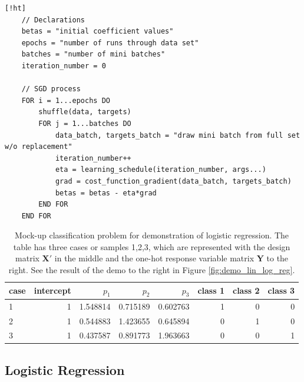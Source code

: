 \documentclass[]{article}
\begin{document}
\begin{lstlisting}[caption={Stochastic Gradient Descent algorithm. Cost function gradients and learning schedules may be defined independently of the implementation of SGD. This implementation runs for \lstinline|epochs*batches| iterations, and does not sense if or when it converges.},label={lst:sgd}] [!ht]
	// Declarations
	betas = "initial coefficient values"
	epochs = "number of runs through data set"
	batches = "number of mini batches"
	iteration_number = 0

	// SGD process	
	FOR i = 1...epochs DO
		shuffle(data, targets)
		FOR j = 1...batches DO
			data_batch, targets_batch = "draw mini batch from full set w/o replacement"
			iteration_number++
			eta = learning_schedule(iteration_number, args...)
			grad = cost_function_gradient(data_batch, targets_batch)
			betas = betas - eta*grad
		END FOR
	END FOR
\end{lstlisting}


\begin{table}[!ht]
	\caption{Mock-up classification problem for demonstration of logistic regression. The table has three cases or samples 1,2,3, which are represented with the design matrix $\mathbf{X}'$ in the middle and the one-hot response variable matrix $\mathbf{Y}$ to the right. See the result of the demo to the right in Figure \ref{fig:demo_lin_log_reg}.}
	\label{tab:logreg-demo}
	\begin{center}
		\begin{tabular}{l|rrrr|rrr}
			\toprule
			case &  intercept &     $p_1$ &     $p_2$ &     $p_3$ &  class 1 &  class 2 &  class 3 \\
			\midrule
			1 &          1 &  1.548814 &  0.715189 &  0.602763 &        1 &        0 &        0 \\
			2 &          1 &  0.544883 &  1.423655 &  0.645894 &        0 &        1 &        0 \\
			3 &          1 &  0.437587 &  0.891773 &  1.963663 &        0 &        0 &        1 \\
			\bottomrule
		\end{tabular}
	\end{center}
\end{table}




\subsection{Logistic Regression}
\end{document}
